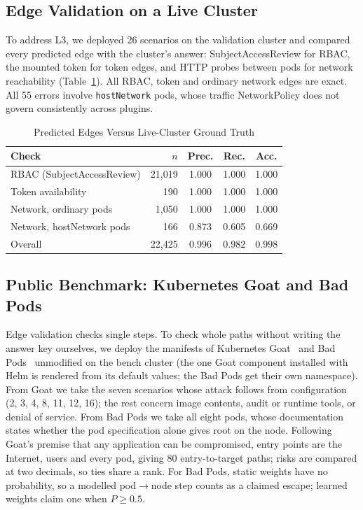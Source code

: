 \documentclass[conference]{IEEEtran}
\newcommand{\ra}{$\rightarrow$}
\begin{document}
\subsection{Edge Validation on a Live Cluster}
To address L3, we deployed 26 scenarios on the validation cluster and compared every predicted edge with the cluster's answer:
SubjectAccessReview for RBAC, the mounted token for token edges, and HTTP probes between pods for network reachability
(Table~\ref{tab:lab}). All RBAC, token and ordinary network edges are exact. All 55 errors involve \texttt{hostNetwork} pods,
whose traffic NetworkPolicy does not govern consistently across plugins.

\begin{table}[t]
\caption{Predicted Edges Versus Live-Cluster Ground Truth}
\label{tab:lab}
\centering
\footnotesize
\begin{tabular}{@{}lrccc@{}}
\toprule
Check & $n$ & Prec. & Rec. & Acc. \\
\midrule
RBAC (SubjectAccessReview) & 21,019 & 1.000 & 1.000 & 1.000 \\
Token availability & 190 & 1.000 & 1.000 & 1.000 \\
Network, ordinary pods & 1,050 & 1.000 & 1.000 & 1.000 \\
Network, hostNetwork pods & 166 & 0.873 & 0.605 & 0.669 \\
\midrule
Overall & 22,425 & 0.996 & 0.982 & 0.998 \\
\bottomrule
\end{tabular}
\end{table}

\subsection{Public Benchmark: Kubernetes Goat and Bad Pods}
Edge validation checks single steps. To check whole paths without writing the answer key ourselves, we deploy the manifests of
Kubernetes Goat~\cite{goat} and Bad Pods~\cite{badpods} unmodified on the bench cluster (the one Goat component installed with
Helm is rendered from its default values; the Bad Pods get their own namespace). From Goat we take the seven scenarios whose
attack follows from configuration (2, 3, 4, 8, 11, 12, 16); the rest concern image contents, audit or runtime tools, or denial
of service. From Bad Pods we take all eight pods, whose documentation states whether the pod specification alone gives root on
the node. Following Goat's premise that any application can be compromised, entry points are the Internet, users and every pod,
giving 80 entry-to-target paths; risks are compared at two decimals, so ties share a rank. For Bad Pods, static weights have no
probability, so a modelled pod\ra node step counts as a claimed escape; learned weights claim one when $P\ge0.5$.
\end{document}
